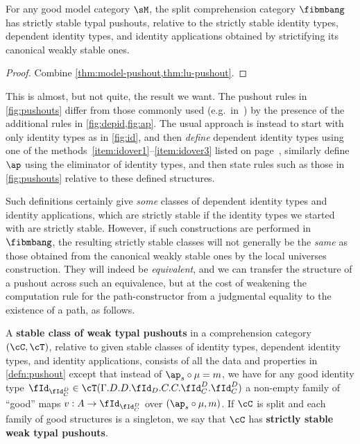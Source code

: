 \documentclass[referee]{psp}
\let\C\cC
\let\T\cT
\let\Id\fId
\begin{document}
\begin{thm}
  For any good model category $\sM$, the split comprehension category $\fibmbang$ has strictly stable typal pushouts, relative to the strictly stable identity types, dependent identity types, and identity applications obtained by strictifying its canonical weakly stable ones.
\end{thm}
\begin{proof}
  Combine \cref{thm:model-pushout,thm:lu-pushout}.
\end{proof}

This is almost, but not quite, the result we want.
The pushout rules in \cref{fig:pushouts} differ from those commonly used (e.g.\ in~\cite{hottbook}) by the presence of the additional rules in \cref{fig:depid,fig:ap}.
The usual approach is instead to start with only identity types as in \cref{fig:id}, and then \emph{define} dependent identity types using one of the methods~\ref{item:idover1}--\ref{item:idover3} listed on page~\pageref{idover}, similarly define $\ap$ using the eliminator of identity types, and then state rules such as those in \ref{fig:pushouts} relative to these defined structures.

Such definitions certainly give \emph{some} classes of dependent identity types and identity applications, which are strictly stable if the identity types we started with are strictly stable.
However, if such constructions are performed in $\fibmbang$, the resulting strictly stable classes will not generally be the \emph{same} as those obtained from the canonical weakly stable ones by the local universes construction.
They will indeed be \emph{equivalent}, and we can transfer the structure of a pushout across such an equivalence, but at the cost of weakening the computation rule for the path-constructor from a judgmental equality to the existence of a path, as follows.

\begin{defn}\label{defn:wk-pushouts}
  A \textbf{stable class of weak typal pushouts} in a comprehension category $(\C,\T)$, relative to given stable classes of identity types, dependent identity types, and identity applications, consists of all the data and properties in \cref{defn:pushout} except that instead of $\ap_s\circ \mu = m$, we have for any good identity type $\Id_{\Id^D_C}\in\T(\Gamma.D.D.\Id_D.C.C.\Id^D_C.\Id^D_C)$ a non-empty family of ``good'' maps $v:A\to \Id_{\Id^D_C}$ over $(\ap_s\circ \mu, m)$.
  If $\C$ is split and each family of good structures is a singleton, we say that $\C$ has \textbf{strictly stable weak typal pushouts}.
\end{defn}
\end{document}
